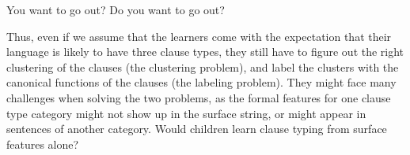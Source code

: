 \bxl
You want to go out?
\ex Do you want to go out?
\exl
\eex


\begin{comment}
In Mandarin, the presence of \twh-phrases and question particles are the two hallmarks of Mandarin interrogatives. But in \twh-interrogatives, the question particle \tit{ne} is optional, and \twh-phrases do not move to sentence initial position. As a result, in some cases like (\ref{ex:intro:man-ne}b), the only difference between the interrogative sentence and its declarative counterpart is the presence of \twh-phrase:

\bex{ex:intro:man-ne}
\bxl
\gll Elmo chi-le dian \tbf{shenme} \tbf{ne}?\\
Elmo eat-\Asp{} \Cl{} what \Sfp{}\\
``What did Elmo eat?''
\ex \gll Elmo chi-le dian \tbf{shenme}?\\
Elmo eat-\Asp{} \Cl{} what\\
``What did Elmo eat?''
\exl
\eex 

\bex{ex:intro:man-np}
\gll Elmo chi-le dian binggan\\
Elmo eat-\Asp{} \Cl{} cookie\\
``Elmo ate some cookies.''
\eex

However, declarative sentences could also have \twh-phrases, where these phrases are interpreted as indefinites like English \tit{any/a} (\cite{huang1982, cheng1991,LMYY2021}). %


\bex{ex:intro:m-whamb}
\gll Xiaoxiao mei 	chi 	\tun{shenme} dongxi\\ 
Xiaoxiao \Neg{} 	eat	what	things\\
a.	``What didn’t Xiaoxiao eat?''	\hfill Interrogative \twh\\
b.	``Xiaoxiao didn’t eat anything.''		\hfill Indefinite \twh
\eex

In (\ref{ex:intro:m-whamb}), the interrogative version of the string 
\end{comment}

Thus, even if we assume that the learners come with the expectation that their language is likely to have three clause types, they still have to figure out the right clustering of the clauses (the clustering problem), and label the clusters with the canonical functions of the clauses (the labeling problem). They might face many challenges when solving the two problems, as the formal features for one clause type category might not show up in the surface string, or might appear in sentences of another category. Would children learn clause typing from surface features alone? 

